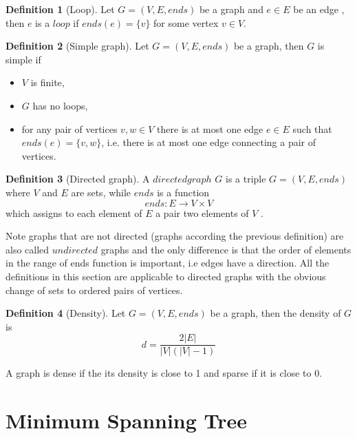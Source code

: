 \documentclass{report}
\theoremstyle{plain}
\theoremstyle{definition}
\newtheorem{definition}{Definition}
\theoremstyle{remark}
\begin{document}
\begin{definition}[Loop]
Let $G = (V, E, ends)$ be a graph and $e \in E$ be an edge , then $e$ is a $loop$ if $ends(e) = \{v\}$ for some vertex $v \in V$.
\end{definition}

\begin{definition}[Simple graph]
Let $G = (V, E, ends)$ be a graph, then $G$ is simple if
\begin{itemize}
\item $V$ is finite,
\item $G$ has no loops,
\item for any pair of vertices $v,w \in V$ there is at most one edge $e \in E$ such that $ends(e) = \{v, w\}$, i.e. there is at most one edge connecting a pair of vertices.
\end{itemize}
\end{definition}

\begin{definition}[Directed graph]
A $directed graph$  $G$ is a triple $G = (V, E, ends)$ where $V$ and $E$ are sets, while $ends$ is a function 
  \begin{equation}
  ends:E\to V \times V
  \end{equation}
which assigns to each element of $E$ a pair two elements of $V$ .
\end{definition}

Note graphs that are not directed (graphs according the previous definition) are also called $undirected$ graphs and the only difference is that the order of elements in the range of ends function is important, i.e edges have a direction. All the definitions in this section are applicable to directed graphs with the obvious change of sets to ordered pairs of vertices.

\begin{definition}[Density]

Let $G = (V, E, ends)$ be a graph, then the density of $G$ is 
  \begin{equation}
  d=\frac{2|E|}{|V|(|V|-1)}
  \end{equation}
\end{definition}

A graph is dense if the its density is close to 1 and sparse if it is close to 0.

\section*{Minimum Spanning Tree}
\end{document}
